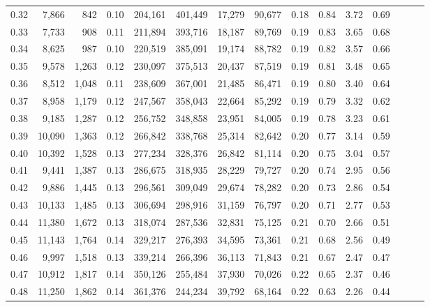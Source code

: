 \begin{tabular}{rrrrrrrrrrrrrrr}
0.32 &   7,866 &    842 &  0.10 &  204,161 &  401,449 &   17,279 &   90,677 &  0.18 &  0.84 &  3.72 &      0.69 \\
0.33 &   7,733 &    908 &  0.11 &  211,894 &  393,716 &   18,187 &   89,769 &  0.19 &  0.83 &  3.65 &      0.68 \\
0.34 &   8,625 &    987 &  0.10 &  220,519 &  385,091 &   19,174 &   88,782 &  0.19 &  0.82 &  3.57 &      0.66 \\
0.35 &   9,578 &  1,263 &  0.12 &  230,097 &  375,513 &   20,437 &   87,519 &  0.19 &  0.81 &  3.48 &      0.65 \\
0.36 &   8,512 &  1,048 &  0.11 &  238,609 &  367,001 &   21,485 &   86,471 &  0.19 &  0.80 &  3.40 &      0.64 \\
0.37 &   8,958 &  1,179 &  0.12 &  247,567 &  358,043 &   22,664 &   85,292 &  0.19 &  0.79 &  3.32 &      0.62 \\
0.38 &   9,185 &  1,287 &  0.12 &  256,752 &  348,858 &   23,951 &   84,005 &  0.19 &  0.78 &  3.23 &      0.61 \\
0.39 &  10,090 &  1,363 &  0.12 &  266,842 &  338,768 &   25,314 &   82,642 &  0.20 &  0.77 &  3.14 &      0.59 \\
0.40 &  10,392 &  1,528 &  0.13 &  277,234 &  328,376 &   26,842 &   81,114 &  0.20 &  0.75 &  3.04 &      0.57 \\
0.41 &   9,441 &  1,387 &  0.13 &  286,675 &  318,935 &   28,229 &   79,727 &  0.20 &  0.74 &  2.95 &      0.56 \\
0.42 &   9,886 &  1,445 &  0.13 &  296,561 &  309,049 &   29,674 &   78,282 &  0.20 &  0.73 &  2.86 &      0.54 \\
0.43 &  10,133 &  1,485 &  0.13 &  306,694 &  298,916 &   31,159 &   76,797 &  0.20 &  0.71 &  2.77 &      0.53 \\
0.44 &  11,380 &  1,672 &  0.13 &  318,074 &  287,536 &   32,831 &   75,125 &  0.21 &  0.70 &  2.66 &      0.51 \\
0.45 &  11,143 &  1,764 &  0.14 &  329,217 &  276,393 &   34,595 &   73,361 &  0.21 &  0.68 &  2.56 &      0.49 \\
0.46 &   9,997 &  1,518 &  0.13 &  339,214 &  266,396 &   36,113 &   71,843 &  0.21 &  0.67 &  2.47 &      0.47 \\
0.47 &  10,912 &  1,817 &  0.14 &  350,126 &  255,484 &   37,930 &   70,026 &  0.22 &  0.65 &  2.37 &      0.46 \\
0.48 &  11,250 &  1,862 &  0.14 &  361,376 &  244,234 &   39,792 &   68,164 &  0.22 &  0.63 &  2.26 &      0.44 \\

\end{tabular}
